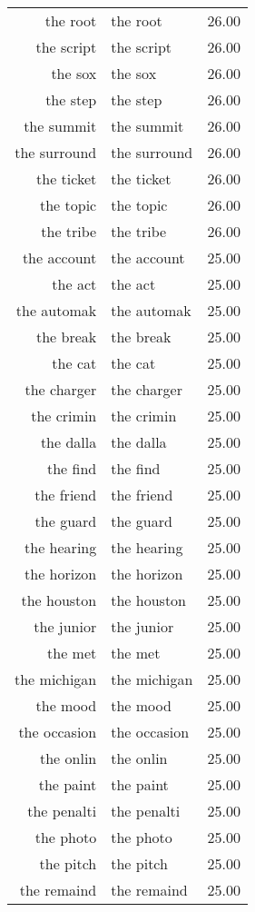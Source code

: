 \begin{table}[ht]
\begin{tabular}{rlr}
  the root & the root & 26.00 \\ 
  the script & the script & 26.00 \\ 
  the sox & the sox & 26.00 \\ 
  the step & the step & 26.00 \\ 
  the summit & the summit & 26.00 \\ 
  the surround & the surround & 26.00 \\ 
  the ticket & the ticket & 26.00 \\ 
  the topic & the topic & 26.00 \\ 
  the tribe & the tribe & 26.00 \\ 
  the account & the account & 25.00 \\ 
  the act & the act & 25.00 \\ 
  the automak & the automak & 25.00 \\ 
  the break & the break & 25.00 \\ 
  the cat & the cat & 25.00 \\ 
  the charger & the charger & 25.00 \\ 
  the crimin & the crimin & 25.00 \\ 
  the dalla & the dalla & 25.00 \\ 
  the find & the find & 25.00 \\ 
  the friend & the friend & 25.00 \\ 
  the guard & the guard & 25.00 \\ 
  the hearing & the hearing & 25.00 \\ 
  the horizon & the horizon & 25.00 \\ 
  the houston & the houston & 25.00 \\ 
  the junior & the junior & 25.00 \\ 
  the met & the met & 25.00 \\ 
  the michigan & the michigan & 25.00 \\ 
  the mood & the mood & 25.00 \\ 
  the occasion & the occasion & 25.00 \\ 
  the onlin & the onlin & 25.00 \\ 
  the paint & the paint & 25.00 \\ 
  the penalti & the penalti & 25.00 \\ 
  the photo & the photo & 25.00 \\ 
  the pitch & the pitch & 25.00 \\ 
  the remaind & the remaind & 25.00 \\ 

\end{tabular}
\end{table}
